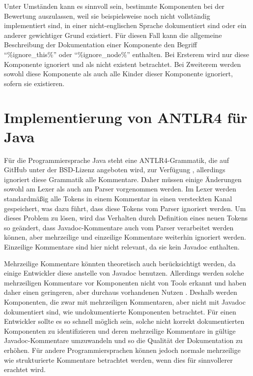 Unter Umständen kann es sinnvoll sein, bestimmte Komponenten bei der Bewertung auszulassen, weil sie beispielsweise noch nicht vollständig implementiert sind, in einer nicht-englischen Sprache dokumentiert sind oder ein anderer gewichtiger Grund existiert. Für diesen Fall kann die allgemeine Beschreibung der Dokumentation einer Komponente  den Begriff \enquote{\%ignore\_this\%} oder \enquote{\%ignore\_node\%} enthalten. Bei Ersterem wird nur diese Komponente ignoriert und als nicht existent betrachtet. Bei Zweiterem werden sowohl diese Komponente als auch alle Kinder dieser Komponente ignoriert, sofern sie existieren.




\section{Implementierung von ANTLR4 für Java}\label{chapter:antlr4_impl}

Für die Programmiersprache Java steht eine ANTLR4-Grammatik, die auf GitHub unter der BSD-Lizenz angeboten wird, zur Verfügung \cite{ANTLRgrammarforjava}, allerdings ignoriert diese Grammatik alle Kommentare. Daher müssen einige Änderungen sowohl am Lexer als auch am Parser vorgenommen werden. Im Lexer werden standardmäßig alle Tokens in einem Kommentar in einen versteckten Kanal gespeichert, was dazu führt, dass diese Tokens vom Parser ignoriert werden. Um dieses Problem zu lösen, wird das Verhalten durch Definition eines neuen Tokens so geändert, dass Javadoc-Kommentare auch vom Parser verarbeitet werden können, aber mehrzeilige und einzeilige Kommentare weiterhin ignoriert werden. Einzeilige Kommentare sind hier nicht relevant, da sie kein Javadoc enthalten.

Mehrzeilige Kommentare könnten theoretisch auch berücksichtigt werden, da einige Entwickler diese anstelle von Javadoc benutzen. Allerdings werden solche mehrzeiligen Kommentare vor Komponenten nicht von Tools erkannt und haben daher einen geringeren, aber durchaus vorhandenen Nutzen \cite[S.~4]{HowDocumentationEvolvesoverTime}. Deshalb werden Komponenten, die zwar mit mehrzeiligen Kommentaren, aber nicht mit Javadoc dokumentiert sind, wie undokumentierte Komponenten betrachtet. Für einen Entwickler sollte es so schnell möglich sein, solche nicht korrekt dokumentierten Komponenten zu identifizieren und deren mehrzeilige Kommentare in gültige Javadoc-Kommentare umzuwandeln und so die Qualität der Dokumentation zu erhöhen. Für andere Programmiersprachen können jedoch normale mehrzeilige wie strukturierte Kommentare betrachtet werden, wenn dies für sinnvollerer erachtet wird.

